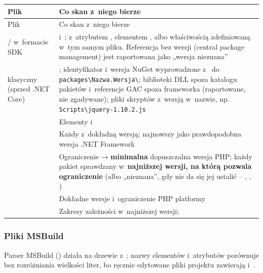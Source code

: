 \begin{xltabular}{\linewidth}{@{}>{\raggedright\arraybackslash}p{3.4cm} >{\raggedright\arraybackslash}X@{}}
\toprule
Plik & Co skan z~niego bierze \\
\midrule
\endfirsthead
\toprule
Plik & Co skan z~niego bierze \\
\midrule
\endhead
{} /  w~formacie SDK &  i~;  z~atrybutem , elementem ,  albo właściwością  zdefiniowaną w~tym samym pliku. Referencja bez wersji (central package management) jest raportowana jako „wersja nieznana” \\
 klasyczny (sprzed .NET Core) & ; identyfikator i~wersja NuGet wyprowadzone z~ do \texttt{packages\textbackslash Nazwa.Wersja\textbackslash}; biblioteki DLL spoza katalogu pakietów i~referencje GAC spoza frameworka (raportowane, nie zgadywane); pliki skryptów z~wersją w~nazwie, np. \texttt{Scripts\textbackslash jquery-1.10.2.js} \\
 & Elementy  i~ \\
 & Każdy  z~dokładną wersją; najnowszy  jako prawdopodobna wersja .NET Framework \\
 & Ograniczenie  → \textbf{minimalna} dopuszczalna wersja PHP; każdy pakiet sprawdzany w~\textbf{najniższej wersji, na którą pozwala ograniczenie} (albo „nieznana”, gdy nie da się jej ustalić -- , \repopath{*}, ) \\
 & Dokładne wersje i~ograniczenie PHP platformy \\
 & Zakresy zależności w~najniższej wersji;  \\
\bottomrule
\end{xltabular}

\subsubsection{Pliki MSBuild}

Parser MSBuild () działa na drzewie z~;
nazwy elementów i~atrybutów porównuje bez rozróżniania wielkości liter, bo ręcznie edytowane
pliki projektu zawierają  i~.

